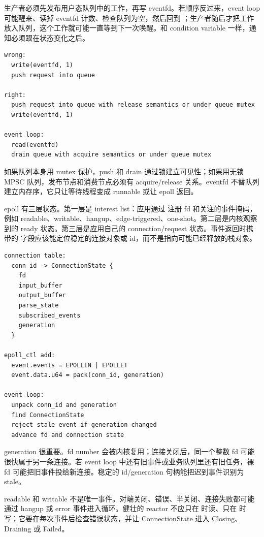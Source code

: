 生产者必须先发布用户态队列中的工作，再写 eventfd。若顺序反过来，event loop 可能醒来、读掉 eventfd 计数、检查队列为空，然后回到 ；生产者随后才把工作放入队列，这个工作就可能一直等到下一次唤醒。和 condition variable 一样，通知必须跟在状态变化之后。

\begin{lstlisting}[numbers=none,caption={eventfd 唤醒顺序的对错}]
wrong:
  write(eventfd, 1)
  push request into queue

right:
  push request into queue with release semantics or under queue mutex
  write(eventfd, 1)

event loop:
  read(eventfd)
  drain queue with acquire semantics or under queue mutex
\end{lstlisting}

如果队列本身用 mutex 保护，push 和 drain 通过锁建立可见性；如果用无锁 MPSC 队列，发布节点和消费节点必须有 acquire/release 关系。eventfd 不替队列建立内存序，它只让等待线程变成 runnable 或让 epoll 返回。

epoll 有三层状态。第一层是 interest list：应用通过  注册 fd 和关注的事件掩码，例如 readable、writable、hangup、edge-triggered、one-shot。第二层是内核观察到的 ready 状态。第三层是应用自己的 connection/request 状态。事件返回时携带的  字段应该能定位稳定的连接对象或 id，而不是指向可能已经释放的栈对象。

\begin{lstlisting}[numbers=none,caption={epoll fd 注册要能回到稳定状态对象}]
connection table:
  conn_id -> ConnectionState {
    fd
    input_buffer
    output_buffer
    parse_state
    subscribed_events
    generation
  }

epoll_ctl add:
  event.events = EPOLLIN | EPOLLET
  event.data.u64 = pack(conn_id, generation)

event loop:
  unpack conn_id and generation
  find ConnectionState
  reject stale event if generation changed
  advance fd and connection state
\end{lstlisting}

generation 很重要。fd number 会被内核复用；连接关闭后，同一个整数 fd 可能很快属于另一条连接。若 event loop 中还有旧事件或业务队列里还有旧任务，裸 fd 可能把旧事件投给新连接。稳定的 id/generation 句柄能把迟到事件识别为 stale。

readable 和 writable 不是唯一事件。对端关闭、错误、半关闭、连接失败都可能通过 hangup 或 error 事件进入循环。健壮的 reactor 不应只在  时读、只在  时写；它要在每次事件后检查错误状态，并让 ConnectionState 进入 Closing、Draining 或 Failed。

